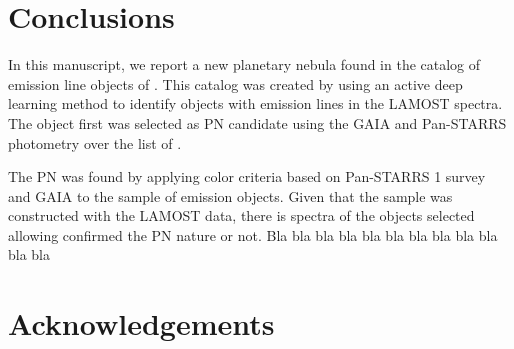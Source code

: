 \documentclass[fleqn,usenatbib]{mnras}
\begin{document}
{\section{Conclusions}
\label{sec:conclu}

In this manuscript, we report a new planetary nebula found
in the catalog of emission line objects of \citet{Skoda:2020}.
This catalog was created by using an active deep learning method
to identify objects with emission lines in the LAMOST spectra.
The object first was selected as PN candidate using the GAIA
and Pan-STARRS photometry over the list of \citet{Skoda:2020}.

The PN was found by applying color criteria based on Pan-STARRS 1
 survey and GAIA to the sample of emission objects.
Given that the \citet{Skoda:2020} sample was constructed
with the LAMOST data, there is spectra of the objects selected
allowing confirmed the PN nature or not.
Bla bla bla bla bla bla bla bla bla bla bla bla

\section*{Acknowledgements}

}
\end{document}
